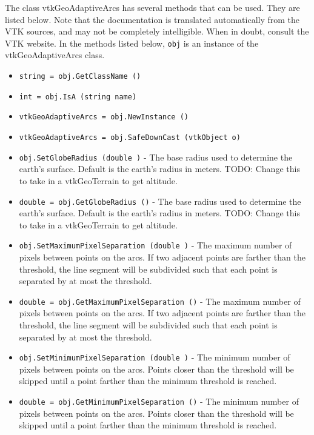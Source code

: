 The class vtkGeoAdaptiveArcs has several methods that can be used.
  They are listed below.
Note that the documentation is translated automatically from the VTK sources,
and may not be completely intelligible.  When in doubt, consult the VTK website.
In the methods listed below, \verb|obj| is an instance of the vtkGeoAdaptiveArcs class.
\begin{itemize}
\item  \verb|string = obj.GetClassName ()|

\item  \verb|int = obj.IsA (string name)|

\item  \verb|vtkGeoAdaptiveArcs = obj.NewInstance ()|

\item  \verb|vtkGeoAdaptiveArcs = obj.SafeDownCast (vtkObject o)|

\item  \verb|obj.SetGlobeRadius (double )| -  The base radius used to determine the earth's surface.
 Default is the earth's radius in meters.
 TODO: Change this to take in a vtkGeoTerrain to get altitude.

\item  \verb|double = obj.GetGlobeRadius ()| -  The base radius used to determine the earth's surface.
 Default is the earth's radius in meters.
 TODO: Change this to take in a vtkGeoTerrain to get altitude.

\item  \verb|obj.SetMaximumPixelSeparation (double )| -  The maximum number of pixels between points on the arcs.
 If two adjacent points are farther than the threshold,
 the line segment will be subdivided such that each point
 is separated by at most the threshold.

\item  \verb|double = obj.GetMaximumPixelSeparation ()| -  The maximum number of pixels between points on the arcs.
 If two adjacent points are farther than the threshold,
 the line segment will be subdivided such that each point
 is separated by at most the threshold.

\item  \verb|obj.SetMinimumPixelSeparation (double )| -  The minimum number of pixels between points on the arcs.
 Points closer than the threshold will be skipped until
 a point farther than the minimum threshold is reached.

\item  \verb|double = obj.GetMinimumPixelSeparation ()| -  The minimum number of pixels between points on the arcs.
 Points closer than the threshold will be skipped until
 a point farther than the minimum threshold is reached.


\end{itemize}
